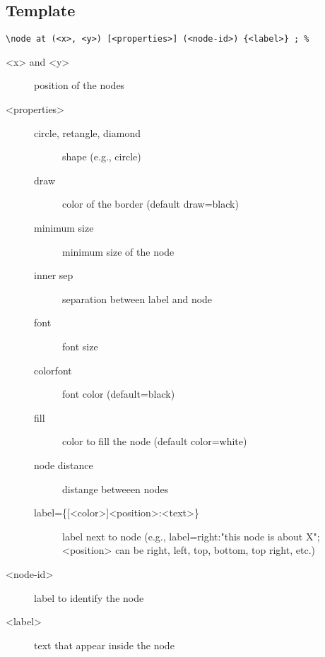 \documentclass[a4paper]{article}
\begin{document}
\FloatBarrier
\clearpage

\subsection{Template}
\label{sec:org774504e}

\lstset{numbers=left,language=[LaTeX]TeX,label= ,caption= ,captionpos=b}
\begin{lstlisting}
\node at (<x>, <y>) [<properties>] (<node-id>) {<label>} ; %
\end{lstlisting}

\begin{description}
\item[{\color{red} <x> \color{black} and \color{red} <y> \color{black}}] position of the nodes
\item[{\color{red} <properties> \color{black}}] \begin{description}
\item[{circle, retangle, diamond}] shape (e.g., circle)
\item[{draw         }] color of the border (default draw=black)
\item[{minimum size }] minimum size of the node
\item[{inner sep    }] separation between label and node
\item[{font         }] font size
\item[{colorfont    }] font color (default=black)
\item[{fill         }] color to fill the node (default color=white)
\item[{node distance}] distange betweeen nodes
\item[{label=\{[<color>]<position>:\normalsize<text>\}        }] label next to node (e.g., label=right:"this node is about X"; <position> can be right, left, top, bottom, top right, etc.)
\end{description}
\item[{\color{red} <node-id> \color{black}}] label to identify the node
\item[{\color{red} <label> \color{black}}] text that appear inside the node
\end{description}
\end{document}
